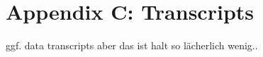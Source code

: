 
\chapter{Appendix C: Transcripts} %

\label{AppendixC} %

ggf. data transcripts aber das ist halt so lächerlich wenig.. 